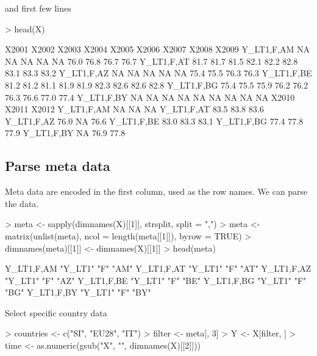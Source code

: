 \documentclass[a4paper,12pt]{article}\usepackage[]{graphicx}\usepackage[]{color}
\begin{document}
and first few lines

\begin{Schunk}
\begin{Sinput}
> head(X)
\end{Sinput}
\begin{Soutput}
           X2001 X2002 X2003 X2004 X2005 X2006 X2007 X2008 X2009
Y_LT1,F,AM    NA    NA    NA    NA    NA  76.0  76.8  76.7  76.7
Y_LT1,F,AT  81.7  81.7  81.5  82.1  82.2  82.8  83.1  83.3  83.2
Y_LT1,F,AZ    NA    NA    NA    NA    NA  75.4  75.5  76.3  76.3
Y_LT1,F,BE  81.2  81.2  81.1  81.9  81.9  82.3  82.6  82.6  82.8
Y_LT1,F,BG  75.4  75.5  75.9  76.2  76.2  76.3  76.6  77.0  77.4
Y_LT1,F,BY    NA    NA    NA    NA    NA    NA    NA    NA    NA
           X2010 X2011 X2012
Y_LT1,F,AM    NA    NA    NA
Y_LT1,F,AT  83.5  83.8  83.6
Y_LT1,F,AZ  76.0    NA  76.6
Y_LT1,F,BE  83.0  83.3  83.1
Y_LT1,F,BG  77.4  77.8  77.9
Y_LT1,F,BY    NA  76.9  77.8
\end{Soutput}
\end{Schunk}
\subsection{Parse meta data}

Meta data are encoded in the first column, used as the row names. We can parse the data.

\begin{Schunk}
\begin{Sinput}
> meta <- sapply(dimnames(X)[[1]], strsplit, split = ",")
> meta <- matrix(unlist(meta), ncol = length(meta[[1]]), byrow = TRUE)
> dimnames(meta)[[1]] <- dimnames(X)[[1]]
> head(meta)
\end{Sinput}
\begin{Soutput}
           [,1]    [,2] [,3]
Y_LT1,F,AM "Y_LT1" "F"  "AM"
Y_LT1,F,AT "Y_LT1" "F"  "AT"
Y_LT1,F,AZ "Y_LT1" "F"  "AZ"
Y_LT1,F,BE "Y_LT1" "F"  "BE"
Y_LT1,F,BG "Y_LT1" "F"  "BG"
Y_LT1,F,BY "Y_LT1" "F"  "BY"
\end{Soutput}
\end{Schunk}

Select specific country data

\begin{Schunk}
\begin{Sinput}
> countries <- c("SI", "EU28", "IT")
> filter <- meta[, 3] %in% countries
> Y <- X[filter, ]
> time <- as.numeric(gsub("X", "", dimnames(X)[[2]]))
\end{Sinput}
\end{Schunk}
\end{document}
